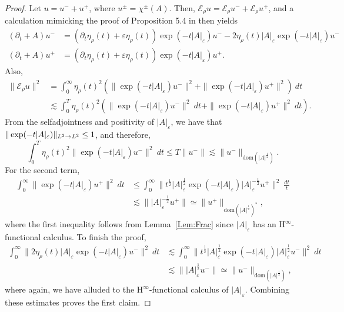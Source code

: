 \documentclass[a4paper,10pt,reqno]{amsart}
\newcommand{\cbrac}[1]{\left(#1\right)}
\newcommand{\modulus}[1]{|#1|}
\newcommand{\norm}[1]{\| #1 \|}%
\newcommand{\Lp}[2][{}]{{\rm L}^{#2}_{\rm #1}}%
\newcommand{\dom}{\mathrm{dom}}
\newcommand{\ext}{\mathcal{E}}
\renewcommand{\epsilon}{\varepsilon}
\newcommand{\Hinfty}{$\mathrm{H}^\infty$}
\theoremstyle{definition}
\begin{document}
\begin{proof}
Let $u = u^- + u^+$, where $u^{\pm} = \chi^{\pm}(A)$.
Then, $ \ext_\rho u = \ext_\rho u^- + \ext_\rho u^+$, and a calculation mimicking the proof of Proposition 5.4 in \cite{BBan} then yields
\begin{equation}
\label{Eqn:Soln}
\begin{aligned}
(\partial_t + A) u^- & = (\partial_t \eta_\rho(t) + \epsilon \eta_\rho(t)) \exp(-t \modulus{A}_\epsilon)u^- - 2 \eta_\rho(t) \modulus{A}_\epsilon \exp(-t\modulus{A}_\epsilon)u^- \\
(\partial_t + A) u^+ & = (\partial_t \eta_\rho(t) + \epsilon \eta_\rho(t)) \exp(-t \modulus{A}_\epsilon)u^+.
\end{aligned}
\end{equation}
Also,
\begin{align*}
\norm{ \ext_\rho u}^2 & = \int_{0}^\infty \eta_\rho(t)^2 \cbrac{\norm{\exp(-t\modulus{A}_\epsilon) u^-}^2 + \norm{\exp(-t\modulus{A}_\epsilon) u^+}^2}\ dt        \\
                      & \lesssim \int_{0}^T \eta_\rho(t)^2 \cbrac{\norm{\exp(-t\modulus{A}_\epsilon) u^-}^2\ dt + \norm{\exp(-t\modulus{A}_\epsilon) u^+}^2\ dt}.
\end{align*}
From the selfadjointness and positivity of  $\modulus{A}_\epsilon$, we have that $\norm{\exp(-t\modulus{A}_\epsilon)}_{\Lp{2}\to\Lp{2}} \leq 1$, and therefore,
$$
\int_{0}^T \eta_\rho(t)^2 \norm{\exp(-t\modulus{A}_\epsilon) u^-}^2\ dt  \leq T \norm{u^-} \lesssim \norm{u^-}_{\dom(\modulus{A}^{\frac12})}.$$
For the second term,
\begin{align*}
\int_{0}^\infty \norm{\exp(-t\modulus{A}_\epsilon) u^+}^2\ dt & \leq \int_0^\infty \norm{t^{\frac{1}{2}} \modulus{A}_\epsilon^{\frac{1}{2}} \exp(-t\modulus{A}_\epsilon) \modulus{A}_\epsilon^{-\frac{1}{2}} u^+}^2\ \frac{dt}{t} \\
                                                              & \lesssim \norm{\modulus{A}_\epsilon^{-\frac{1}{2}}u^+} \simeq \norm{u^+}_{\dom(\modulus{A}^{\frac12})^\ast},
\end{align*}
where the first inequality follows from Lemma~\ref{Lem:Frac} since $\modulus{A}_\epsilon$ has an \Hinfty-functional calculus.
To finish the proof,
\begin{align*}
\int_{0}^\infty \norm{ 2 \eta_\rho(t) \modulus{A}_\epsilon \exp(-t\modulus{A}_\epsilon)u^-}^2\ dt & \lesssim \int_{0}^\infty \norm{t^{\frac{1}{2}}\modulus{A}_\epsilon^{\frac{1}{2}} \exp(-t\modulus{A}_\epsilon) \modulus{A}_\epsilon^{\frac{1}{2}} u^-}^2\ dt \\
                                                                                                  & \lesssim \norm{\modulus{A}_\epsilon^{\frac{1}{2}}u^-} \simeq \norm{u^-}_{ \dom(\modulus{A}^{\frac12})},
\end{align*}
where again, we have alluded to the \Hinfty-functional calculus of $\modulus{A}_\epsilon$.
Combining these estimates proves the first claim.


\end{proof}
\end{document}
